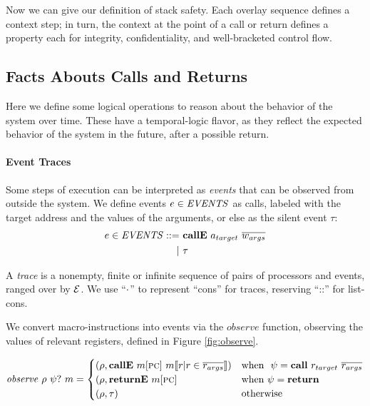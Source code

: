 \documentclass[10pt,conference]{ieeetran}%
\theoremstyle{definition}
\begin{document}
Now we can give our definition of stack safety. Each overlay sequence defines a
context step; in turn, the context at the point of a call or return defines a
property each for integrity, confidentiality, and well-bracketed control flow.

\subsection{Facts Abouts Calls and Returns}

Here we define some logical operations to reason about the behavior of the
system over time. These have a temporal-logic flavor, as they reflect
the expected behavior of the system in the future, after a possible return.

\paragraph*{Event Traces}

Some steps of execution can be interpreted as {\it events} that can be observed
from outside the system. We define events \(e \in \mathit{EVENTS}\) as calls, labeled
with the target address and the values of the arguments, or else as the silent
event \(\tau\):
\[\begin{split}
e \in \mathit{EVENTS} ::= & ~ \mathbf{callE} ~ a_{target} ~ \overline{w_{args}} \\
| & ~ \tau \\
\end{split}\]

A {\em trace} is a nonempty, finite or infinite sequence
of pairs of processors and events, ranged over by \(\mathcal{E}\).
We use ``\(\cdot\)'' to represent ``cons'' for traces, reserving ``::''
for list-cons.

We convert macro-instructions into events via the \(\mathit{observe}\)
function, observing the values of relevant registers, defined in Figure \ref{fig:observe}.

\begin{figure*}
\[\mathit{observe} ~ \rho ~ \psi? ~ m =
\begin{cases}
  (\rho, \mathbf{callE} ~ m[\textsc{pc}] ~ m \llbracket r | r \in \overline{r_{args}} \rrbracket)
  & \textnormal{when } ~ \psi = \mathbf{call} ~ r_{target} ~ \overline{r_{args}} \\
  (\rho, \mathbf{returnE} ~ m[\textsc{pc}] & \textnormal{when } \psi = \mathbf{return} \\
  (\rho, \tau) & \textnormal{otherwise} \\
\end{cases}\]
\caption{Converting overlay steps to events}
\label{fig:observe}
\end{figure*}
\end{document}
